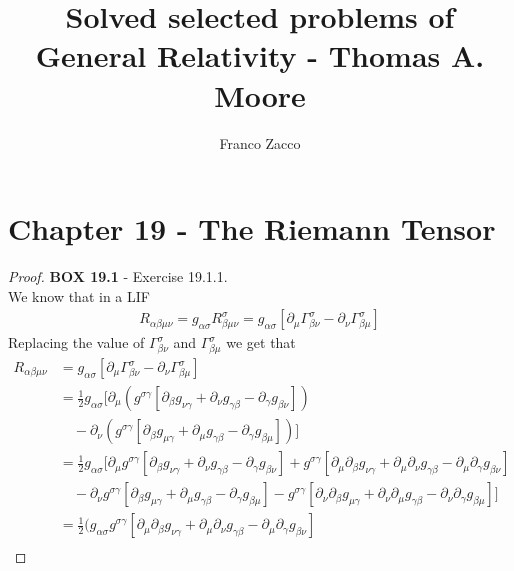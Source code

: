 \documentclass[11pt]{article}
\title{\textbf{Solved selected problems of General Relativity - Thomas A. Moore}}
\author{Franco Zacco}
\date{}
\theoremstyle{definition}
\begin{document}
\maketitle
\thispagestyle{empty}

\section*{Chapter 19 - The Riemann Tensor}

\begin{proof}{\textbf{BOX 19.1} - Exercise 19.1.1.}\\
We know that in a LIF
\begin{align*}
    R_{\alpha\beta\mu\nu} = g_{\alpha\sigma}R^{\sigma}_{\beta\mu\nu}
    = g_{\alpha\sigma}[\partial_{\mu}\Gamma_{\beta\nu}^\sigma
    - \partial_{\nu}\Gamma_{\beta\mu}^\sigma]
\end{align*}
Replacing the value of $\Gamma_{\beta\nu}^\sigma$ and $\Gamma_{\beta\mu}^\sigma$
we get that
\begin{align*}
    R_{\alpha\beta\mu\nu}
    &= g_{\alpha\sigma}[\partial_{\mu}\Gamma_{\beta\nu}^\sigma
    - \partial_{\nu}\Gamma_{\beta\mu}^\sigma]\\
    &= \frac{1}{2}g_{\alpha\sigma}[
    \partial_{\mu}(g^{\sigma\gamma}[\partial_{\beta}g_{\nu\gamma}
    + \partial_{\nu}g_{\gamma\beta} - \partial_{\gamma}g_{\beta\nu}])\\
    &\quad
    - \partial_{\nu}(g^{\sigma\gamma}[\partial_{\beta}g_{\mu\gamma}
    + \partial_{\mu}g_{\gamma\beta} - \partial_{\gamma}g_{\beta\mu}])]\\
    &= \frac{1}{2}g_{\alpha\sigma}[
    \partial_{\mu}g^{\sigma\gamma}[\partial_{\beta}g_{\nu\gamma}
    + \partial_{\nu}g_{\gamma\beta} - \partial_{\gamma}g_{\beta\nu}]
    + g^{\sigma\gamma}[\partial_{\mu}\partial_{\beta}g_{\nu\gamma}
    + \partial_{\mu}\partial_{\nu}g_{\gamma\beta}
    - \partial_{\mu}\partial_{\gamma}g_{\beta\nu}]\\
    &\quad
    - \partial_{\nu}g^{\sigma\gamma}[\partial_{\beta}g_{\mu\gamma}
    + \partial_{\mu}g_{\gamma\beta} - \partial_{\gamma}g_{\beta\mu}]
    - g^{\sigma\gamma}[\partial_{\nu}\partial_{\beta}g_{\mu\gamma}
    + \partial_{\nu}\partial_{\mu}g_{\gamma\beta}
    - \partial_{\nu}\partial_{\gamma}g_{\beta\mu}]]\\
    &= \frac{1}{2}(g_{\alpha\sigma}
    g^{\sigma\gamma}
    [\partial_{\mu}\partial_{\beta}g_{\nu\gamma}
    + \partial_{\mu}\partial_{\nu}g_{\gamma\beta}
    - \partial_{\mu}\partial_{\gamma}g_{\beta\nu}]\\

\end{align*}
\end{proof}
\end{document}
